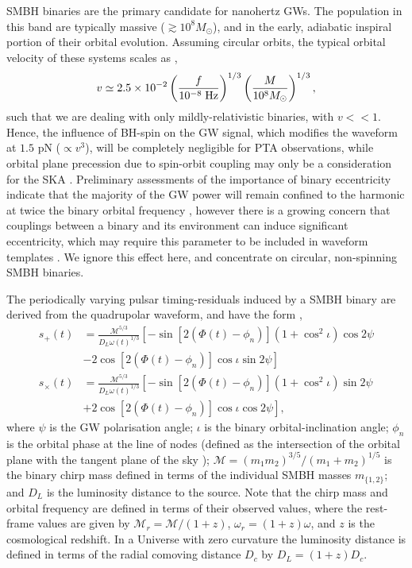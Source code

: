 \documentclass[prd,twocolumn,showpacs,nofootinbib]{revtex4}
\begin{document}
SMBH binaries are the primary candidate for nanohertz GWs. The population in this band are typically massive ($\gtrsim 10^8 M_{\odot}$), and in the early, adiabatic inspiral portion of their orbital evolution. Assuming circular orbits, the typical orbital velocity of these systems scales as \citep{corbin-cornish-2010},
\begin{equation}
v \simeq 2.5\times 10^{-2}\left(\frac{f}{10^{-8}\;{\rm Hz}}\right)^{1/3}\left(\frac{M}{10^8 M_{\odot}}\right)^{1/3},
\end{equation}
such that we are dealing with only mildly-relativistic binaries, with $v<<1$. Hence, the influence of BH-spin on the GW signal, which modifies the waveform at $1.5$ pN ($\propto v^3$), will be completely negligible for PTA observations, while orbital plane precession due to spin-orbit coupling may only be a consideration for the SKA \citep{sesana-vecchio-measuring-2010,mingarelli2012}. Preliminary assessments of the importance of binary eccentricity indicate that the majority of the GW power will remain confined to the harmonic at twice the binary orbital frequency \citep{sesana-vecchio-measuring-2010}, however there is a growing concern that couplings between a binary and its environment can induce significant eccentricity, which may require this parameter to be included in waveform templates \citep{sesana-review-2013-2,tong2013,ravi_eccentricity_2014}. We ignore this effect here, and concentrate on circular, non-spinning SMBH binaries.

The periodically varying pulsar timing-residuals induced by a SMBH binary are derived from the quadrupolar waveform, and have the form \citep{wahlquist-1987,corbin-cornish-2010,ellisoptimal2012},
\begin{align} \label{eq:splusscross}
s_+(t) &= \frac{\mathcal{M}^{5/3}}{D_L\omega(t)^{1/3}}\left[-\sin\left[2\left(\Phi(t)-\phi_n\right)\right]\left(1+\cos^2\iota\right)\cos2\psi\right. \nonumber\\
&\left.- 2\cos\left[2\left(\Phi(t)-\phi_n\right)\right]\cos\iota\sin2\psi\right] \nonumber\\
s_\times(t) &= \frac{\mathcal{M}^{5/3}}{D_L\omega(t)^{1/3}}\left[-\sin\left[2\left(\Phi(t)-\phi_n\right)\right]\left(1+\cos^2\iota\right)\sin2\psi\right. \nonumber\\
&\left. + 2\cos\left[2\left(\Phi(t)-\phi_n\right)\right]\cos\iota\cos2\psi\right],
\end{align}
where $\psi$ is the GW polarisation angle; $\iota$ is the binary orbital-inclination angle; $\phi_n$ is the orbital phase at the line of nodes (defined as the intersection of the orbital plane with the tangent plane of the sky \citep{wahlquist-1987}); $\mathcal{M}=(m_1m_2)^{3/5}/(m_1+m_2)^{1/5}$ is the binary chirp mass defined in terms of the individual SMBH masses $m_{\{1,2\}}$; and $D_L$ is the luminosity distance to the source. Note that the chirp mass and orbital frequency are defined in terms of their observed values, where the rest-frame values are given by $\mathcal{M}_r=\mathcal{M}/(1+z)$, $\omega_r = (1+z)\omega$, and $z$ is the cosmological redshift. In a Universe with zero curvature the luminosity distance is defined in terms of the radial comoving distance $D_c$ by $D_L=(1+z)D_c$.
\end{document}
